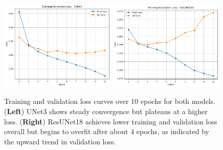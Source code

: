 \begin{figure}[htbp]
    \centering
    \includegraphics[width=0.49\textwidth]{figures/results/2 - segmentation performance/UNet3 Loss.png}
    \hfill
    \includegraphics[width=0.49\textwidth]{figures/results/2 - segmentation performance/ResUNet18 Loss.png}
    \caption{
        Training and validation loss curves over 10 epochs for both models.
        (\textbf{Left}) UNet3 shows steady convergence but plateaus at a higher loss.
        (\textbf{Right}) ResUNet18 achieves lower training and validation loss overall but begins to overfit after about 4 epochs, as indicated by the upward trend in validation loss.
    }
    \label{fig:segmentation_loss_curves}
\end{figure}

